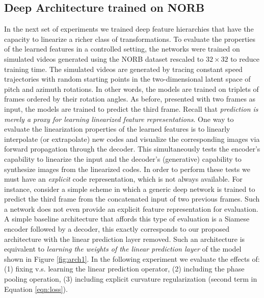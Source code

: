 \documentclass{article} %
\begin{document}
\subsection{Deep Architecture trained on NORB}
\label{subsec:expr2} 
In the next set of experiments we trained deep feature hierarchies that have the capacity to linearize a richer class of transformations. To evaluate the properties of the learned features in a controlled setting, the networks were trained on simulated videos generated using the NORB dataset rescaled to $32 \times 32$ to reduce training time. The simulated videos are generated by tracing constant speed trajectories with random starting points in the two-dimensional latent space of pitch and azimuth rotations. In other words, the models are trained on triplets of frames ordered by their rotation angles. As before, presented with two frames as input, the models are trained to predict the third frame. Recall that \emph{prediction is merely a proxy for learning linearized feature representations}. One way to  evaluate the linearization properties of the learned features is to linearly interpolate (or extrapolate) new codes and visualize the corresponding images via forward propagation through the decoder. This simultaneously tests the encoder's capability to linearize the input and the decoder's (generative) capability to synthesize images from the linearized codes. In order to perform these tests we must have an \emph{explicit} code representation, which is not always available. For instance, consider a simple scheme in which a generic deep network is trained to predict the third frame from the concatenated input of two previous frames. Such a network does not even provide an explicit feature representation for evaluation. A simple baseline architecture that affords this type of evaluation is a Siamese encoder followed by a decoder, this exactly corresponds to our proposed architecture with the linear prediction layer removed. Such an architecture is equivalent to \emph{learning the weights of the linear prediction layer} of the model shown in Figure \ref{fig:arch1}. In the following experiment we evaluate the effects of: (1) fixing v.s. learning the linear prediction operator, (2) including the phase pooling operation, (3) including explicit curvature regularization (second term in Equation \ref{eqn:loss}).
        
\end{document}
